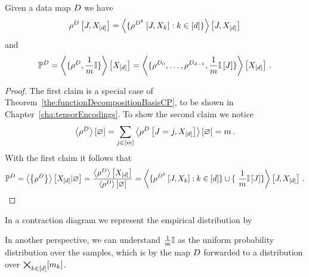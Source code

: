 \begin{theorem}\label{the:empCPRep}
	Given a data map $D$ we have
	\begin{align*}
		\rho^{D}\left[J,X_{[d]}\right]  
		= \left\langle 
		\{\rho^{D^{k}}\left[J,X_{k}\right] : k\in[d] \} 
		\right\rangle \left[ J,X_{[d]} \right] 
	\end{align*}
	and
	\begin{align*}
	\mathbb{P}^{D} = \left\langle \{\rho^{D}, \frac{1}{m}\mathbb{I} \}\right\rangle \left[ X_{[d]} \right] 
	= \left\langle \{\rho^{D_{0}},\ldots,\rho^{D_{d-1}}, \frac{1}{m}\mathbb{I}\left[J\right] \}\right\rangle \left[ X_{[d]} \right] \, . 
	\end{align*}
\end{theorem}
\begin{proof}
	The first claim is a special case of Theorem~\ref{the:functionDecompositionBasisCP}, to be shown in Chapter~\ref{cha:tensorEncodings}.
	To show the second claim we notice
		\[ \left\langle \rho^{D}\right\rangle \left[ \varnothing \right] = \sum_{j\in[m]} \left\langle \rho^{D}\left[J=j,X_{[d]}\right]\right\rangle \left[ \varnothing \right] = m \,  . \]
	With the first claim it follows that
	\begin{align*}
		\empdistribution 
		 = \sbnormationof{\datacore}{\shortcatvariables}
		 = \frac{\sbcontractionof{\datacore}{\shortcatvariables}}{\sbcontraction{\datacore}} 
		 =  \contractionof{
		\{\rencodingofat{\datamap^{\atomenumerator}}{\datvariable,\catvariableof{\atomenumerator}} : \atomenumeratorin \} \cup \{ \frac{1}{\datanum} \onesat{\datvariable} \}
		}{\datvariable,\shortcatvariables}  \, . 
	\end{align*}
\end{proof}

In a contraction diagram we represent the empirical distribution by
\begin{center}
	
\end{center}

In another perspective, we can understand $\frac{1}{m}\mathbb{I}$ as the uniform probability distribution over the samples, which is by the map $D$ forwarded to a distribution over $\bigtimes_{k\in[d]}[m_{k}]$.















